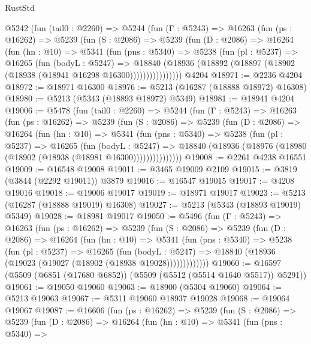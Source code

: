 \begin{lexlean}{RustStd}
\begin{coremodule}
    @5242
      (fun (tail0 : @2260) =>
      @5244
        (fun (Γ : @5243) =>
        @16263
          (fun (ps : @16262) =>
          @5239
            (fun (S : @2086) =>
            @5239
              (fun (D : @2086) =>
              @16264
                (fun (hn : @10) =>
                @5341
                  (fun (pns : @5340) =>
                  @5238
                    (fun (pl : @5237) =>
                    @16265
                      (fun (bodyL : @5247) =>
                      @18840
                        (@18936
                          (@18892 (@18897 (@18902 (@18938 (@18941 @16298 @16300))))))))))))))))
    @4204
@18971 := @2236 @4204
@18972 := @18971 @16300
@18976 := @5213 (@16287 (@18888 @18972) @16308)
@18980 := @5213 (@5343 (@18893 @18972) @5349)
@18981 := @18941 @4204
@19006 := @5478
    (fun (tail0 : @2260) =>
    @5244
      (fun (Γ : @5243) =>
      @16263
        (fun (ps : @16262) =>
        @5239
          (fun (S : @2086) =>
          @5239
            (fun (D : @2086) =>
            @16264
              (fun (hn : @10) =>
              @5341
                (fun (pns : @5340) =>
                @5238
                  (fun (pl : @5237) =>
                  @16265
                    (fun (bodyL : @5247) =>
                    @18840 (@18936 (@18976 (@18980 (@18902 (@18938 (@18981 @16300)))))))))))))))
@19008 := @2261 @4238 @16551
@19009 := @16548 @19008
@19011 := @3465 @19009 @2109
@19015 := @3819 (@3844 (@2292 @19011)) @3879
@19016 := @16547 @19015
@19017 := @4208 @19016
@19018 := @19006 @19017
@19019 := @18971 @19017
@19023 := @5213 (@16287 (@18888 @19019) @16308)
@19027 := @5213 (@5343 (@18893 @19019) @5349)
@19028 := @18981 @19017
@19050 := @5496
    (fun (Γ : @5243) =>
    @16263
      (fun (ps : @16262) =>
      @5239
        (fun (S : @2086) =>
        @5239
          (fun (D : @2086) =>
          @16264
            (fun (hn : @10) =>
            @5341
              (fun (pns : @5340) =>
              @5238
                (fun (pl : @5237) =>
                @16265
                  (fun (bodyL : @5247) =>
                  @18840 (@18936 (@19023 (@19027 (@18902 (@18938 @19028)))))))))))))
@19060 := @16597 (@5509 (@6851 (@17680 @6852)) (@5509 (@5512 (@5514 @1640 @5517)) @5291))
@19061 := @19050 @19060
@19063 := @18900 (@5304 @19060)
@19064 := @5213 @19063
@19067 := @5311 @19060 @18937 @19028
@19068 := @19064 @19067
@19087 := @16606
    (fun (ps : @16262) =>
    @5239
      (fun (S : @2086) =>
      @5239
        (fun (D : @2086) =>
        @16264
          (fun (hn : @10) =>
          @5341
            (fun (pns : @5340) =>

\end{coremodule}
\end{lexlean}
